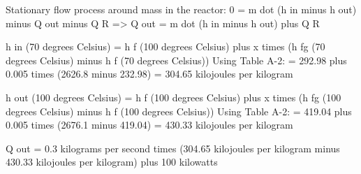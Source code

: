 Stationary flow process around mass in the reactor:  
0 = m dot (h in minus h out) minus Q out minus Q R  
=> Q out = m dot (h in minus h out) plus Q R  

h in (70 degrees Celsius) = h f (100 degrees Celsius) plus x times (h fg (70 degrees Celsius) minus h f (70 degrees Celsius))  
Using Table A-2:  
= 292.98 plus 0.005 times (2626.8 minus 232.98)  
= 304.65 kilojoules per kilogram  

h out (100 degrees Celsius) = h f (100 degrees Celsius) plus x times (h fg (100 degrees Celsius) minus h f (100 degrees Celsius))  
Using Table A-2:  
= 419.04 plus 0.005 times (2676.1 minus 419.04)  
= 430.33 kilojoules per kilogram  

Q out = 0.3 kilograms per second times (304.65 kilojoules per kilogram minus 430.33 kilojoules per kilogram) plus 100 kilowatts